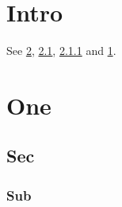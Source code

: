\documentclass{book}
\begin{document}
\chapter{Intro}\label{c:i}
See \cref{a:one}, \cref{a:sec}, \cref{a:sub} and \cref{c:i}.
\appendix
\chapter{One}\label{a:one}
\section{Sec}\label{a:sec}
\subsection{Sub}\label{a:sub}
\end{document}
